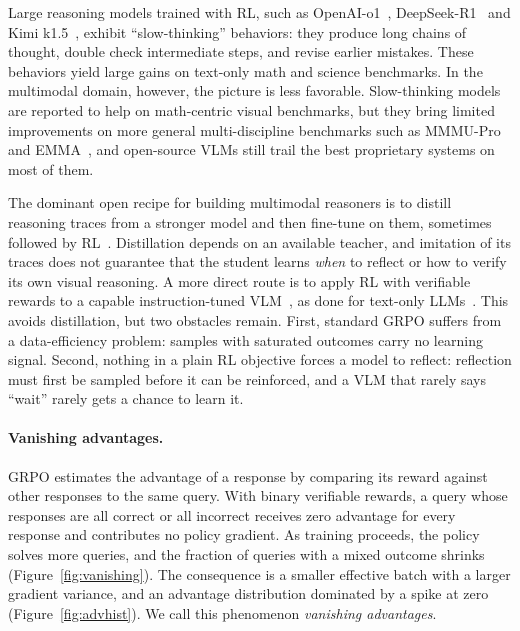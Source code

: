 \documentclass{article}
\begin{document}
Large reasoning models trained with RL, such as OpenAI-o1~\citep{openai-o1}, DeepSeek-R1~\citep{deepseek-r1} and Kimi k1.5~\citep{kimi-1_5}, exhibit ``slow-thinking'' behaviors: they produce long chains of thought, double check intermediate steps, and revise earlier mistakes. These behaviors yield large gains on text-only math and science benchmarks. In the multimodal domain, however, the picture is less favorable. Slow-thinking models are reported to help on math-centric visual benchmarks, but they bring limited improvements on more general multi-discipline benchmarks such as MMMU-Pro~\citep{mmmupro} and EMMA~\citep{emma}, and open-source VLMs still trail the best proprietary systems on most of them.

The dominant open recipe for building multimodal reasoners is to distill reasoning traces from a stronger model and then fine-tune on them, sometimes followed by RL~\citep{llavacot,Mulberry,R1OneVision,vision-r1,OpenVLThinker,virgo}. Distillation depends on an available teacher, and imitation of its traces does not guarantee that the student learns \emph{when} to reflect or how to verify its own visual reasoning. A more direct route is to apply RL with verifiable rewards to a capable instruction-tuned VLM~\citep{mmeureka,lmm-r1,r1vl}, as done for text-only LLMs~\citep{deepseek-r1,simplerl,open-reasoner-zero}. This avoids distillation, but two obstacles remain. First, standard GRPO suffers from a data-efficiency problem: samples with saturated outcomes carry no learning signal. Second, nothing in a plain RL objective forces a model to reflect: reflection must first be sampled before it can be reinforced, and a VLM that rarely says ``wait'' rarely gets a chance to learn it.

\paragraph{Vanishing advantages.} GRPO estimates the advantage of a response by comparing its reward against other responses to the same query. With binary verifiable rewards, a query whose responses are all correct or all incorrect receives zero advantage for every response and contributes no policy gradient. As training proceeds, the policy solves more queries, and the fraction of queries with a mixed outcome shrinks (Figure~\ref{fig:vanishing}). The consequence is a smaller effective batch with a larger gradient variance, and an advantage distribution dominated by a spike at zero (Figure~\ref{fig:advhist}). We call this phenomenon \emph{vanishing advantages}.
\end{document}
